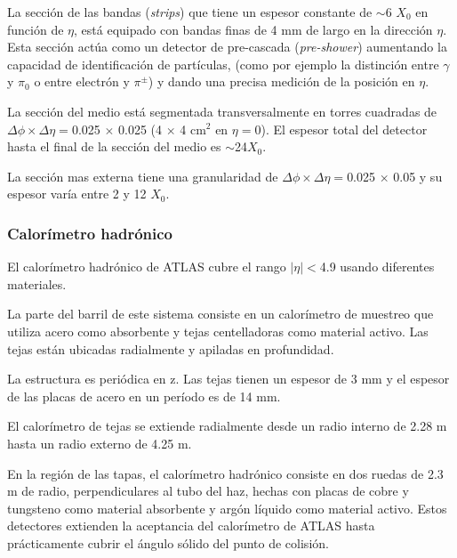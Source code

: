 La sección de las bandas (\emph{strips}) que tiene un espesor constante de
$\sim$6 $X_0$ en función de $\eta$, está equipado con bandas finas de 4 mm de
largo en la dirección $\eta$. Esta sección actúa como un detector de pre-cascada
(\emph{pre-shower}) aumentando la capacidad de identificación de partículas,
(como por ejemplo la distinción entre $\gamma$ y $\pi_0$ o entre electrón y
$\pi^\pm$) y dando una precisa medición de la posición en $\eta$.

La sección del medio está segmentada transversalmente en torres cuadradas de
$\Delta \phi \times \Delta \eta=$0.025 $\times$ 0.025 (4 $\times$ 4 cm$^2$ en
$\eta=0$). El espesor total del detector hasta el final de la sección del medio
es $\sim$24$X_0$.

La sección mas externa tiene una granularidad de
$\Delta\phi\times\Delta\eta=$0.025 $\times$ 0.05 y su espesor varía entre 2 y 12
$X_0$.

\subsubsection{Calorímetro hadrónico}
El calorímetro hadrónico de ATLAS \cite{calohadTDR} cubre el rango $|\eta|<$4.9
usando diferentes materiales.

La parte del barril de este sistema consiste en un calorímetro de muestreo que
utiliza acero como absorbente y tejas centelladoras como material activo. Las
tejas están ubicadas radialmente y apiladas en profundidad.




La estructura es periódica en z. Las tejas tienen un espesor de 3 mm y el
espesor de las placas de acero en un período es de 14 mm.

El calorímetro de tejas se extiende radialmente desde un radio interno de 2.28 m
hasta un radio externo de 4.25 m.

En la región de las tapas, el calorímetro hadrónico consiste en dos ruedas de
2.3 m de radio, perpendiculares al tubo del haz, hechas con placas de cobre y
tungsteno como material absorbente y argón líquido como material activo. Estos
detectores extienden la aceptancia del calorímetro de ATLAS hasta prácticamente
cubrir el ángulo sólido del punto de colisión.



